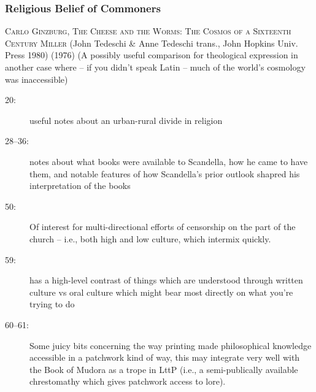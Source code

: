 \documentclass[../FGP.tex]{subfiles}
\begin{document}
\subsubsection{Religious Belief of Commoners}
\begin{annotated-bibliography}
\item \textsc{Carlo Ginzburg, The Cheese and the Worms: The Cosmos of a Sixteenth Century Miller} (John Tedeschi \& Anne Tedeschi trans., John Hopkins Univ. Press 1980) (1976) (A possibly useful comparison for theological expression in another case where -- if you didn't speak Latin -- much of the world's cosmology was inaccessible)\begin{description}
\item[20:]\hspace{.25em} useful notes about an urban-rural divide in religion
\item[28--36:]\hspace{.25em} notes about what books were available to Scandella, how he came to have them, and notable features of how Scandella's prior outlook shapred his interpretation of the books
\item[50:]\hspace{.25em} Of interest for multi-directional efforts of censorship on the part of the church -- i.e., both high and low culture, which intermix quickly.
\item[59:]\hspace{.25em} has a high-level contrast of things which are understood through written culture vs oral culture which might bear most directly on what you're trying to do
\item[60--61:]\hspace{.25em} Some juicy bits concerning the way printing made philosophical knowledge accessible in a patchwork kind of way, this may integrate very well with the Book of Mudora as a trope in LttP (i.e., a semi-publically available chrestomathy which gives patchwork access to lore).
\end{description}
\end{annotated-bibliography}
\end{document}
